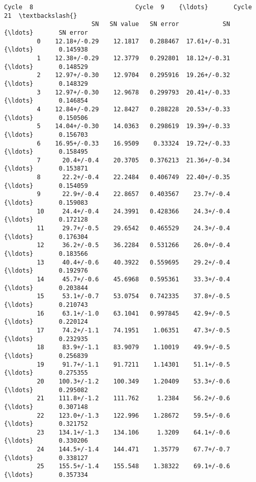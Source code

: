 \documentclass[11pt]{article}
\begin{document}
\begin{Verbatim}[commandchars=\\\{\}]
                  Cycle  8                            Cycle  9    {\ldots}       Cycle 21  \textbackslash{}
                        SN   SN value   SN error            SN    {\ldots}       SN error   
         0    12.18+/-0.29    12.1817   0.288467  17.61+/-0.31    {\ldots}       0.145938   
         1    12.38+/-0.29    12.3779   0.292801  18.12+/-0.31    {\ldots}       0.148529   
         2    12.97+/-0.30    12.9704   0.295916  19.26+/-0.32    {\ldots}       0.148329   
         3    12.97+/-0.30    12.9678   0.299793  20.41+/-0.33    {\ldots}       0.146854   
         4    12.84+/-0.29    12.8427   0.288228  20.53+/-0.33    {\ldots}       0.150506   
         5    14.04+/-0.30    14.0363   0.298619  19.39+/-0.33    {\ldots}       0.156703   
         6    16.95+/-0.33    16.9509    0.33324  19.72+/-0.33    {\ldots}       0.158495   
         7      20.4+/-0.4    20.3705   0.376213  21.36+/-0.34    {\ldots}       0.153871   
         8      22.2+/-0.4    22.2484   0.406749  22.40+/-0.35    {\ldots}       0.154059   
         9      22.9+/-0.4    22.8657   0.403567    23.7+/-0.4    {\ldots}       0.159083   
         10     24.4+/-0.4    24.3991   0.428366    24.3+/-0.4    {\ldots}       0.172128   
         11     29.7+/-0.5    29.6542   0.465529    24.3+/-0.4    {\ldots}       0.176304   
         12     36.2+/-0.5    36.2284   0.531266    26.0+/-0.4    {\ldots}       0.183566   
         13     40.4+/-0.6    40.3922   0.559695    29.2+/-0.4    {\ldots}       0.192976   
         14     45.7+/-0.6    45.6968   0.595361    33.3+/-0.4    {\ldots}       0.203844   
         15     53.1+/-0.7    53.0754   0.742335    37.8+/-0.5    {\ldots}       0.210743   
         16     63.1+/-1.0    63.1041   0.997845    42.9+/-0.5    {\ldots}       0.220124   
         17     74.2+/-1.1    74.1951    1.06351    47.3+/-0.5    {\ldots}       0.232935   
         18     83.9+/-1.1    83.9079    1.10019    49.9+/-0.5    {\ldots}       0.256839   
         19     91.7+/-1.1    91.7211    1.14301    51.1+/-0.5    {\ldots}       0.275355   
         20    100.3+/-1.2    100.349    1.20409    53.3+/-0.6    {\ldots}       0.295082   
         21    111.8+/-1.2    111.762     1.2384    56.2+/-0.6    {\ldots}       0.307148   
         22    123.0+/-1.3    122.996    1.28672    59.5+/-0.6    {\ldots}       0.321752   
         23    134.1+/-1.3    134.106     1.3209    64.1+/-0.6    {\ldots}       0.330206   
         24    144.5+/-1.4    144.471    1.35779    67.7+/-0.7    {\ldots}       0.338127   
         25    155.5+/-1.4    155.548    1.38322    69.1+/-0.6    {\ldots}       0.357334   

\end{Verbatim}
\end{document}
